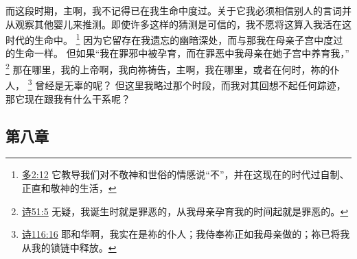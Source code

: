 \documentclass[12pt, a4paper, oneside]{ctexart}
\begin{document}
	而这段时期，主啊，我不记得已在我生命中度过。关于它我必须相信别人的言词并从观察其他婴儿来推测。即使许多这样的猜测是可信的，我不愿将这算入我活在这时代的生命中。
    \footnote {
        \href{https://biblehub.com/titus/2-12.htm}{多2:12} 它教导我们对不敬神和世俗的情感说“不”，并在这现在的时代过自制、正直和敬神的生活，
    }
	因为它留存在我遗忘的幽暗深处，而与那我在母亲子宫中度过的生命一样。
	但如果“我在罪邪中被孕育，而在罪恶中我母亲在她子宫中养育我，”
    \footnote {
        \href{https://biblehub.com/psalms/51-5.htm}{诗51:5} 无疑，我诞生时就是罪恶的，从我母亲孕育我的时间起就是罪恶的。
    }
    那在哪里，我的上帝啊，我向祢祷告，主啊，我在哪里，或者在何时，祢的仆人，
    \footnote {
        \href{https://biblehub.com/psalms/116-16.htm}{诗116:16} 耶和华啊，我实在是祢的仆人；我侍奉祢正如我母亲做的；祢已将我从我的锁链中释放。
    }
    曾经是无辜的呢？
	但这里我略过那个时段，而我对其回想不起任何踪迹，那它现在跟我有什么干系呢？

\subsection{第八章}
\end{document}
